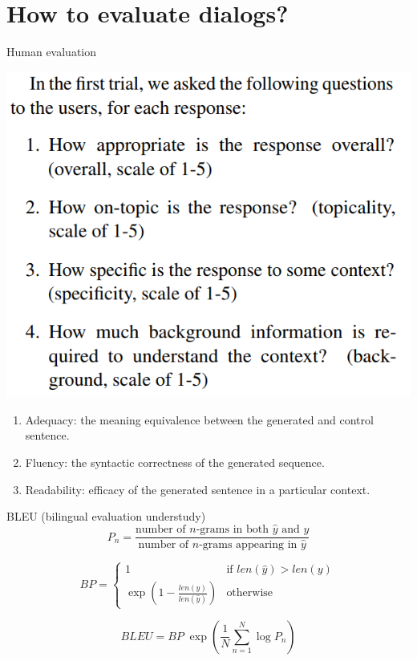 \documentclass[10pt]{beamer}
\begin{document}
\section{How to evaluate dialogs?}


\begin{frame}{Human evaluation  \cite{Lowe:2016}}
\begin{center}
\includegraphics[scale=0.2]{images/exemploEval1.png}
\end{center}

\begin{enumerate}
\item \alert{Adequacy}: the meaning equivalence between the generated and control sentence. 
\item \alert{Fluency}: the syntactic correctness of the generated sequence.
\item \alert{Readability}: efficacy of the generated sentence in a particular context.
\end{enumerate}

\end{frame}

\begin{frame}{BLEU (bilingual evaluation understudy) \cite{Papineni2001}}
\begin{equation}
P_n = \frac{\text{number of } n\text{-grams in both } \hat{y} \text{ and } y}{\text{number of } n\text{-grams appearing in } \hat{y}}
\end{equation}    
\vspace{0.2cm}

\begin{equation}
BP=
\begin{cases}
1 & \text{if } len(\hat{y}) > len(y) \\
\exp\left( 1 - \frac{len(y)}{len(\hat{y})} \right) & \text{otherwise}
\end{cases}
\end{equation} 
\vspace{0.2cm}

\begin{equation}
BLEU = BP \; \exp \left(\frac{1}{N}  \sum_{n=1}^{N} \log P_n \right)
\end{equation}
\end{frame}
\end{document}

